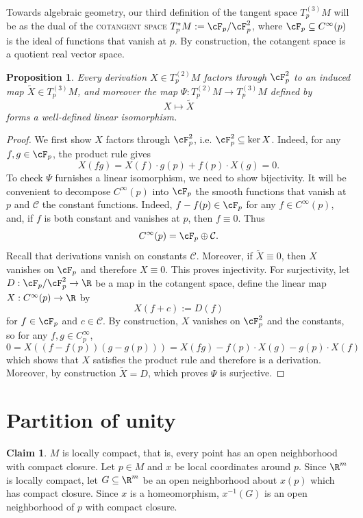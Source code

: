 \documentclass[reqno]{amsart}
\newtheorem{proposition}[theorem]{Proposition}
\theoremstyle{definition}
\newtheorem*{claim}{Claim}
\theoremstyle{remark}
\renewcommand{\emph}{\textsc}
\begin{document}
	Towards algebraic geometry, our third definition of the tangent space $T^{(3)}_p M$ will be as the dual of the \emph{cotangent space} $T^*_p M := \cF_p / \cF_p^2$, where $\cF_p \subseteq C^\infty (p)$ is the ideal of functions that vanish at $p$. By construction, the cotangent space is a quotient real vector space.

	
	\begin{proposition}
		Every derivation $X \in T^{(2)}_p M$ factors through $\cF_p^2$ to an induced map $\widetilde X \in T^{(3)}_p M$, and moreover the map $\Psi: T^{(2)}_p M \to T^{(3)}_p M$ defined by 
			\[ X \mapsto \widetilde X\]
		forms a well-defined linear isomorphism. 	
	\end{proposition}
	
	\begin{proof}
	We first show $X$ factors through $\cF_p^2$, i.e. $\cF_p^2 \subseteq \ker X$. Indeed, for any $f, g \in \cF_p$, the product rule gives
		\[ X(fg) = X(f) \cdot g(p) + f(p) \cdot X(g) = 0. \]
	To check $\Psi$ furnishes a linear isomorphism, we need to show bijectivity. It will be convenient to decompose $C^\infty (p)$ into $\cF_p$ the smooth functions that vanish at $p$ and $\mathcal C$ the constant functions. Indeed, $f - f(p) \in \cF_p$ for any $f \in C^\infty (p)$, and, if $f$ is both constant and vanishes at $p$, then $f \equiv 0$. Thus
		\[ C^\infty(p) = \cF_p \oplus \mathcal C. \]
	Recall that derivations vanish on constants $\mathcal C$. Moreover, if $\widetilde X \equiv 0$, then $X$ vanishes on $\cF_p$ and therefore $X \equiv 0$. This proves injectivity. For surjectivity, let $D: \cF_p /\cF_p^2 \to \R$ be a map in the cotangent space, define the linear map $X : C^\infty(p) \to \R$ by 
		\[ X(f + c) := D(f) \]
	for $f \in \cF_p$ and $c \in \mathcal C$. By construction, $X$ vanishes on $\cF_p^2$ and the constants, so for any $f, g \in C^\infty_p$, 
		\[ 0 = X((f - f(p))(g - g(p))) = X(fg) -  f(p) \cdot X(g) - g(p) \cdot X(f) \]	
	which shows that $X$ satisfies the product rule and therefore is a derivation. Moreover, by construction $\widetilde X = D$, which proves $\Psi$ is surjective. 
	\end{proof}

\section{Partition of unity}

\begin{claim}
		$M$ is locally compact, that is, every point has an open neighborhood with compact closure. Let $p \in M$ and $x$ be local coordinates around $p$. Since $\R^m$ is locally compact, let $G \subseteq \R^m$ be an open neighborhood about $x(p)$ which has compact closure. Since $x$ is a homeomorphism, $x^{-1} (G)$ is an open neighborhood of $p$ with compact closure. 
	\end{claim}
	
\end{document}
